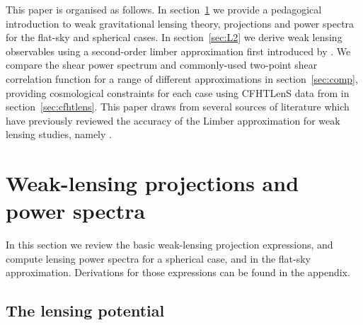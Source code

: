 \documentclass[fleqn,usenatbib]{mnras} %
\begin{document}
This paper is organised as follows.  In section~\ref{sec:wl} we provide a pedagogical introduction to weak gravitational lensing theory, projections and power spectra for the flat-sky and spherical cases.  In section~\ref{sec:L2} we derive weak lensing observables using a second-order limber approximation first introduced by \citet{2008PhRvD..78l3506L}.  We compare the shear power spectrum and commonly-used two-point shear correlation function for a range of different approximations in section~\ref{sec:comp}, providing cosmological constraints for each case using CFHTLenS data from \citet{CFHTLenS-2pt-notomo} in section~\ref{sec:cfhtlens}.  This paper draws from several sources of literature which have previously reviewed the accuracy of the Limber approximation for weak lensing studies, namely \citet{2008PhRvD..78d3002S,2012PhRvD..86b3001B, 2012MNRAS.422.2854G}.


\section{Weak-lensing projections and power spectra}
\label{sec:wl}

In this section we review the basic weak-lensing projection expressions, and
compute lensing power spectra for a spherical case, and in the flat-sky
approximation. Derivations for those expressions can be found in the appendix.

\subsection{The lensing potential}
\label{sec:psi}
\end{document}
